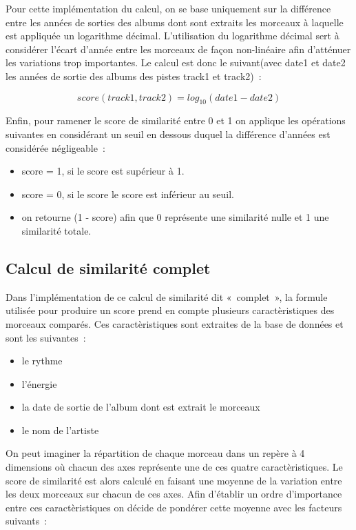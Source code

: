 Pour cette implémentation du calcul, on se base uniquement sur la différence entre les années de sorties des albums dont sont extraits les morceaux à laquelle est appliquée un logarithme décimal. L'utilisation du logarithme décimal sert à considérer l'écart d'année entre les morceaux de façon non-linéaire afin d'atténuer les variations trop importantes. Le calcul est donc le suivant(avec date1 et date2 les années de sortie des albums des pistes track1 et track2)~:

\begin{equation*}
  score(track1, track2) = log_{10}(date1 - date2)
\end{equation*}\newline

Enfin, pour ramener le score de similarité entre 0 et 1 on applique les opérations suivantes en considérant un seuil en dessous duquel la différence d'années est considérée négligeable~:

\begin{itemize}
\item score = 1, si le score est supérieur à 1. 
\item score = 0, si le score le score est inférieur au seuil.
\item on retourne (1 - score) afin que 0 représente une similarité nulle et 1 une similarité totale.
\end{itemize}

\subsection{Calcul de similarité complet}
\label{impl:similarite:complet}

Dans l'implémentation de ce calcul de similarité dit «~complet~», la formule utilisée pour produire un score prend en compte plusieurs caractèristiques des morceaux comparés. Ces caractèristiques sont extraites de la base de données et sont les suivantes~:

\begin{itemize}
\item le rythme
\item l'énergie
\item la date de sortie de l'album dont est extrait le morceaux
\item le nom de l'artiste
\end{itemize}

On peut imaginer la répartition de chaque morceau dans un repère à 4 dimensions où chacun des axes représente une de ces quatre caractèristiques. Le score de similarité est alors calculé en faisant une moyenne de la variation entre les deux morceaux sur chacun de ces axes.\newline
Afin d'établir un ordre d'importance entre ces caractèristiques on décide de pondérer cette moyenne avec les facteurs suivants~:

